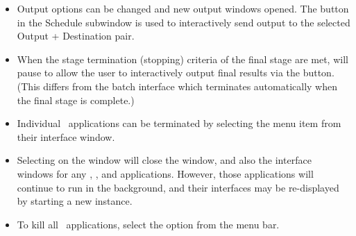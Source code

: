 \begin{list}{}{\setlength{\labelwidth}{0pt}
               \setlength{\leftmargin}{0pt}
               \setlength{\rightmargin}{\leftmargin}
               \setlength{\itemsep}{0pt}}
\begin{description}
\begin{itemize}
\begin{itemize}
                             criteria are met.
         \item {\bf Step:}   Do one solver iteration and then pause.
         \item {\bf Pause:}  Click anytime to stop the solver.  Continue
             simulation from paused point with ,  or
             .
         \item {\bf Stage:}  Interactively change the current stage
             index by either typing the desired stage number (counting
             from 0) into the  entry box or by moving the
             associated slider.
       \end{itemize}
       \item Output options can be changed and new output windows
             opened.  The  button in the  Schedule
             subwindow is used to interactively send output to the
             selected Output + Destination pair.
       \item When the stage termination (stopping) criteria of the
             final stage are met,  will pause to allow the
             user to interactively output final results via the
              button. (This differs from the
             batch interface which terminates automatically when the
             final stage is complete.)
    \end{itemize}
  \end{description}
  \item {}
  \begin{itemize}
    \item Individual \OOMMF\ applications can be terminated by selecting 
       the  menu item from their interface window.
    \item Selecting  on the  window
       will close the  window, and also the interface
       windows for any , , and 
       applications.  However, those applications will continue to run
       in the background, and their interfaces may be re-displayed by
       starting a new  instance.
    \item To kill all \OOMMF\ applications, select the
        option from the 
       menu bar.
  \end{itemize}
\end{list}
